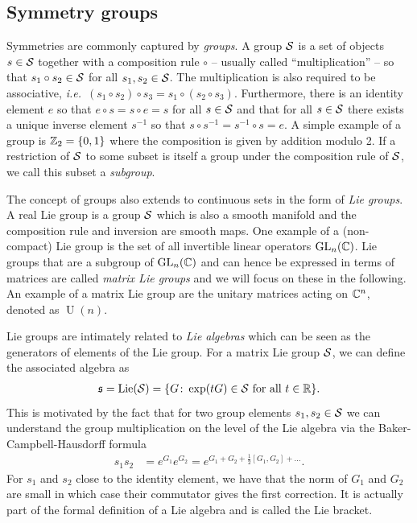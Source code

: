 \documentclass[a4paper,twocolumn,notitlepage,nofootinbib,superscriptaddress,floatfix]{revtex4-2}
\newcommand{\ie}{\textit{i.e.}\ }
\begin{document}
\subsection*{Symmetry groups}
Symmetries are commonly captured by \emph{groups}. A group $\mathcal{S}$ is a set of objects $s \in \mathcal{S}$ together with a composition rule $\circ$ -- usually called \enquote{multiplication} -- so that $s_1 \circ s_2 \in \mathcal{S}$ for all $s_1, s_2 \in \mathcal{S}$. The multiplication is also required to be associative, \ie $(s_1 \circ s_2) \circ s_3 = s_1 \circ (s_2 \circ s_3)$. Furthermore, there is an identity element $e$ so that $e \circ s = s \circ e = s$ for all $s \in \mathcal{S}$ and that for all $s \in \mathcal{S}$ there exists a unique inverse element $s^{-1}$ so that $s \circ s^{-1} = s^{-1} \circ s = e$. A simple example of a group is $\mathbb{Z}_2 = \{ 0, 1\}$ where the composition is given by addition modulo 2.
If a restriction of $\mathcal{S}$ to some subset is itself a group under the composition rule of $\mathcal{S}$, we call this subset a \emph{subgroup}.

The concept of groups also extends to continuous sets in the form of \emph{Lie groups}. A real Lie group is a group $\mathcal{S}$ which is also a smooth manifold and the composition rule and inversion are smooth maps. One example of a (non-compact) Lie group is the set of all invertible linear operators $\operatorname{GL}_n(\mathbb{C})$. Lie groups that are a subgroup of $\operatorname{GL}_n(\mathbb{C})$ and can hence be expressed in terms of matrices are called \emph{matrix Lie groups} and we will focus on these in the following. An example of a matrix Lie group are the unitary matrices acting on $\mathbb{C}^{n}$, denoted as $\operatorname{U}(n)$.

Lie groups are intimately related to \emph{Lie algebras} which can be seen as the generators of elements of the Lie group. For a matrix Lie group $\mathcal{S}$, we can define the associated algebra as
\begin{align}
    \mathfrak{s} = \operatorname{Lie}(\mathcal{S}) = \{ G \colon \exp(tG) \in \mathcal{S} \text{ for all } t\in \mathbb{R} \}.
\end{align}
This is motivated by the fact that for two group elements $s_1, s_2 \in \mathcal{S}$ we can understand the group multiplication on the level of the Lie algebra via the Baker-Campbell-Hausdorff formula
\begin{align}
    s_1 s_2 &= e^{G_1}e^{G_2} = e^{G_1 + G_2 + \frac{1}{2}[G_1, G_2]+ \dots}.
\end{align}
For $s_1$ and $s_2$ close to the identity element, we have that the norm of $G_1$ and $G_2$ are small in which case their commutator gives the first correction. It is actually part of the formal definition of a Lie algebra and is called the Lie bracket. 
\end{document}
